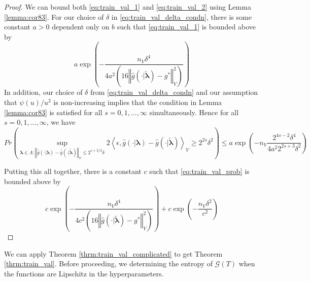 \documentclass[12pt]{article}
\begin{document}
\begin{proof}
	We can bound both \eqref{eq:train_val_1} and \eqref{eq:train_val_2} using Lemma \ref{lemma:cor83}. For our choice of $\delta$ in \eqref{eq:train_val_delta_condn},
	there is some constant $a>0$ dependent only on $b$ such that \eqref{eq:train_val_1} is bounded above by
	\[ 
	a\exp\left(-\frac{n_{V}\delta^{4}}{4a^{2}\left(16\left\Vert \hat{g}(\cdot|\tilde{\boldsymbol{\lambda}})-g^{*}\right\Vert _{V}^{2}\right)}\right)
	\]
	In addition, our choice of $\delta$ from \eqref{eq:train_val_delta_condn} and our assumption that $\psi(u)/u^2$ is non-increasing implies that the condition in Lemma \ref{lemma:cor83} is satisfied for all $s=0,1,...,\infty$ simultaneously. Hence for all $s=0,1,...,\infty$, we have
	\[
	Pr\left(
	\sup_{\boldsymbol{\lambda} \in \Lambda: \left\Vert \hat{g}(\cdot|{\boldsymbol{\lambda}})-\hat{g}(\cdot|\tilde{\boldsymbol{\lambda}})\right\Vert _{V}
		\le
		2^{s+3/2}\delta}
	2\left\langle \epsilon,\hat{g}(\cdot|{\boldsymbol{\lambda}})-\hat{g}(\cdot|\tilde{\boldsymbol{\lambda}})\right\rangle _{V}
	\ge
	2^{2s} \delta^{2}
	\right)
	\le 
	a\exp\left(-n_{V}\frac{2^{4s-2}\delta^{4}}{4a^{2}2^{2s+3}\delta^{2}}\right)
	\]
	
	Putting this all together, there is a constant $c$ such that \eqref{eq:train_val_prob} is bounded above by
	\begin{equation}
	c\exp\left(-\frac{n_{V}\delta^{4}}{4 c^{2}\left(16\left\Vert \hat{g}(\cdot|\tilde{\boldsymbol{\lambda}})-g^{*}\right\Vert _{V}^{2}\right)}\right)
	+
	c\exp\left(-\frac{n_{V} \delta^2}{c^{2}}\right)
	\end{equation}
	
\end{proof}

We can apply Theorem \ref{thrm:train_val_complicated} to get Theorem \ref{thrm:train_val}. Before proceeding, we determining the entropy of $\mathcal{G}(T)$ when the functions are Lipschitz in the hyperparameters.
\end{document}
